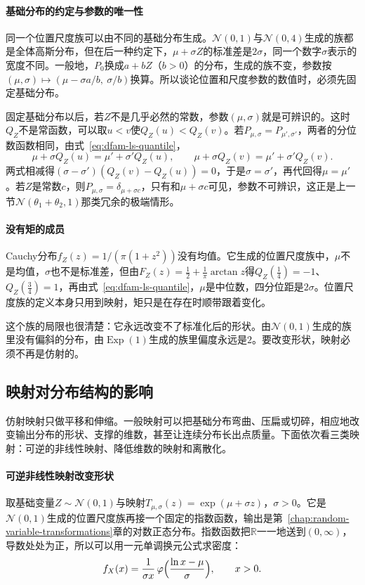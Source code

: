 \paragraph{基础分布的约定与参数的唯一性}
同一个位置尺度族可以由不同的基础分布生成。$\mathcal{N}(0,1)$与$\mathcal{N}(0,4)$生成的族都是全体高斯分布，但在后一种约定下，$\mu+\sigma Z$的标准差是$2\sigma$，同一个数字$\sigma$表示的宽度不同。一般地，$P_0$换成$a+bZ$（$b>0$）的分布，生成的族不变，参数按$(\mu,\sigma)\mapsto(\mu-\sigma a/b,\ \sigma/b)$换算。所以谈论位置和尺度参数的数值时，必须先固定基础分布。

固定基础分布以后，若$Z$不是几乎必然的常数，参数$(\mu,\sigma)$就是可辨识的。这时$Q_Z$不是常函数，可以取$u<v$使$Q_Z(u)<Q_Z(v)$。若$P_{\mu,\sigma}=P_{\mu',\sigma'}$，两者的分位数函数相同，由式~\eqref{eq:dfam-ls-quantile}，
\[
  \mu+\sigma Q_Z(u)=\mu'+\sigma'Q_Z(u),\qquad\mu+\sigma Q_Z(v)=\mu'+\sigma'Q_Z(v).
\]
两式相减得$(\sigma-\sigma')(Q_Z(v)-Q_Z(u))=0$，于是$\sigma=\sigma'$，再代回得$\mu=\mu'$。若$Z$是常数$c$，则$P_{\mu,\sigma}=\delta_{\mu+\sigma c}$，只有和$\mu+\sigma c$可见，参数不可辨识，这正是上一节$\mathcal{N}(\theta_1+\theta_2,1)$那类冗余的极端情形。

\paragraph{没有矩的成员}
Cauchy分布$f_Z(z)=1/(\pi(1+z^{2}))$没有均值。它生成的位置尺度族中，$\mu$不是均值，$\sigma$也不是标准差，但由$F_Z(z)=\tfrac12+\tfrac1\pi\arctan z$得$Q_Z(\tfrac14)=-1$、$Q_Z(\tfrac34)=1$，再由式~\eqref{eq:dfam-ls-quantile}，$\mu$是中位数，四分位距是$2\sigma$。位置尺度族的定义本身只用到映射，矩只是在存在时顺带跟着变化。

这个族的局限也很清楚：它永远改变不了标准化后的形状。由$\mathcal{N}(0,1)$生成的族里没有偏斜的分布，由$\operatorname{Exp}(1)$生成的族里偏度永远是$2$。要改变形状，映射必须不再是仿射的。

\subsection{映射对分布结构的影响}
\label{sec:dfam-map-effects}

仿射映射只做平移和伸缩。一般映射可以把基础分布弯曲、压扁或切碎，相应地改变输出分布的形状、支撑的维数，甚至让连续分布长出点质量。下面依次看三类映射：可逆的非线性映射、降低维数的映射和离散化。

\paragraph{可逆非线性映射改变形状}
取基础变量$Z\sim\mathcal{N}(0,1)$与映射$T_{\mu,\sigma}(z)=\exp(\mu+\sigma z)$，$\sigma>0$。它是$\mathcal{N}(0,1)$生成的位置尺度族再接一个固定的指数函数，输出是第~\ref{chap:random-variable-transformations}章的对数正态分布。指数函数把$\mathbb{R}$一一地送到$(0,\infty)$，导数处处为正，所以可以用一元单调换元公式求密度：
\[
  f_X(x)=\frac{1}{\sigma x}\,\varphi\Bigl(\frac{\ln x-\mu}{\sigma}\Bigr),\qquad x>0 .
\]

